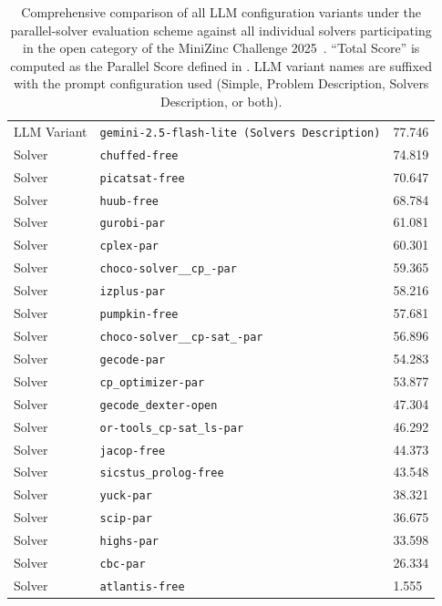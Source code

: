 \documentclass[../../main]{subfiles}
\begin{document}
\begin{table}[!ht]
{\begin{tabular}{lll}
            LLM  Variant & \texttt{gemini-2.5-flash-lite (Solvers Description)} & 77.746 \\ 
            Solver & \texttt{chuffed-free} & 74.819 \\ 
            Solver & \texttt{picatsat-free} & 70.647 \\ 
            Solver & \texttt{huub-free} & 68.784 \\ 
            Solver & \texttt{gurobi-par} & 61.081 \\ 
            Solver & \texttt{cplex-par} & 60.301 \\ 
            Solver & \texttt{choco-solver\_\_cp\_-par} & 59.365 \\ 
            Solver & \texttt{izplus-par} & 58.216 \\ 
            Solver & \texttt{pumpkin-free} & 57.681 \\ 
            Solver & \texttt{choco-solver\_\_cp-sat\_-par} & 56.896 \\ 
            Solver & \texttt{gecode-par} & 54.283 \\ 
            Solver & \texttt{cp\_optimizer-par} & 53.877 \\ 
            Solver & \texttt{gecode\_dexter-open} & 47.304 \\ 
            Solver & \texttt{or-tools\_cp-sat\_ls-par} & 46.292 \\ 
            Solver & \texttt{jacop-free} & 44.373 \\ 
            Solver & \texttt{sicstus\_prolog-free} & 43.548 \\ 
            Solver & \texttt{yuck-par} & 38.321 \\ 
            Solver & \texttt{scip-par} & 36.675 \\ 
            Solver & \texttt{highs-par} & 33.598 \\ 
            Solver & \texttt{cbc-par} & 26.334 \\ 
            Solver & \texttt{atlantis-free} & 1.555 \\ \hline
        \end{tabular}
        }
    \caption{Comprehensive comparison of all LLM configuration variants under the parallel-solver evaluation scheme against all individual solvers participating in the open category of the MiniZinc Challenge 2025~\cite{MznResults25}. ``Total Score'' is computed as the Parallel Score defined in . LLM variant names are suffixed with the prompt configuration used (Simple, Problem Description, Solvers Description, or both).}
    \label{tab:comparisanVarPar}
\end{table}
\end{document}
